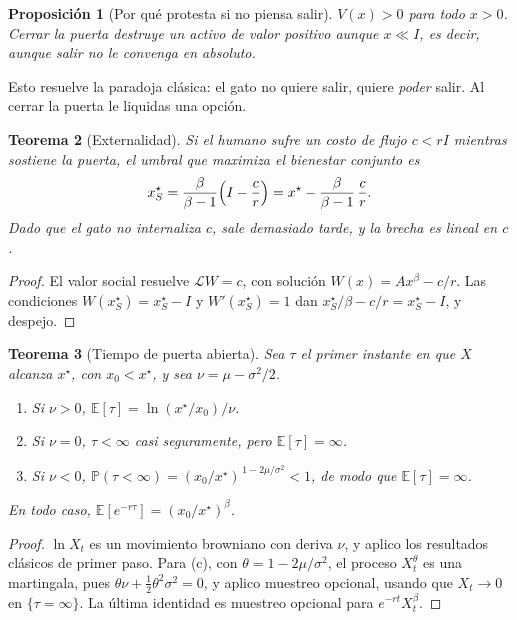 \documentclass[11pt,a4paper]{article}
\theoremstyle{plain}
\newtheorem{teorema}{Teorema}[section]
\newtheorem{proposicion}[teorema]{Proposición}
\theoremstyle{definition}
\theoremstyle{remark}
\numberwithin{equation}{section}
\newcommand{\E}{\mathbb{E}}
\renewcommand{\P}{\mathbb{P}}
\begin{document}
\begin{proposicion}[Por qué protesta si no piensa salir]\label{prop:protesta}
$V(x)>0$ para todo $x>0$. Cerrar la puerta destruye un activo de valor positivo aunque $x\ll I$, es decir, aunque salir no le convenga en absoluto.
\end{proposicion}

Esto resuelve la paradoja clásica: el gato no quiere salir, quiere \emph{poder} salir. Al cerrar la puerta le liquidas una opción.

\begin{teorema}[Externalidad]\label{teo:externalidad}
Si el humano sufre un costo de flujo $c<rI$ mientras sostiene la puerta, el umbral que maximiza el bienestar conjunto es
\begin{equation}
  x_S^\star=\frac{\beta}{\beta-1}\Bigl(I-\frac{c}{r}\Bigr)=x^\star-\frac{\beta}{\beta-1}\,\frac{c}{r}.
\end{equation}
Dado que el gato no internaliza $c$, sale demasiado tarde, y la brecha es lineal en $c$.
\end{teorema}

\begin{proof}
El valor social resuelve $\mathcal LW=c$, con solución $W(x)=Ax^\beta-c/r$. Las condiciones $W(x_S^\star)=x_S^\star-I$ y $W'(x_S^\star)=1$ dan $x_S^\star/\beta-c/r=x_S^\star-I$, y despejo.
\end{proof}

\begin{teorema}[Tiempo de puerta abierta]\label{teo:tiempo}
Sea $\tau$ el primer instante en que $X$ alcanza $x^\star$, con $x_0<x^\star$, y sea $\nu=\mu-\sigma^2/2$.
\begin{enumerate}[label=(\alph*),nosep]
\item Si $\nu>0$, $\E[\tau]=\ln(x^\star/x_0)/\nu$.
\item Si $\nu=0$, $\tau<\infty$ casi seguramente, pero $\E[\tau]=\infty$.
\item Si $\nu<0$, $\P(\tau<\infty)=(x_0/x^\star)^{\,1-2\mu/\sigma^2}<1$, de modo que $\E[\tau]=\infty$.
\end{enumerate}
En todo caso, $\E[e^{-r\tau}]=(x_0/x^\star)^\beta$.
\end{teorema}

\begin{proof}
$\ln X_t$ es un movimiento browniano con deriva $\nu$, y aplico los resultados clásicos de primer paso. Para (c), con $\theta=1-2\mu/\sigma^2$, el proceso $X_t^{\theta}$ es una martingala, pues $\theta\nu+\tfrac12\theta^2\sigma^2=0$, y aplico muestreo opcional, usando que $X_t\to 0$ en $\{\tau=\infty\}$. La última identidad es muestreo opcional para $e^{-rt}X_t^\beta$.
\end{proof}
\end{document}
